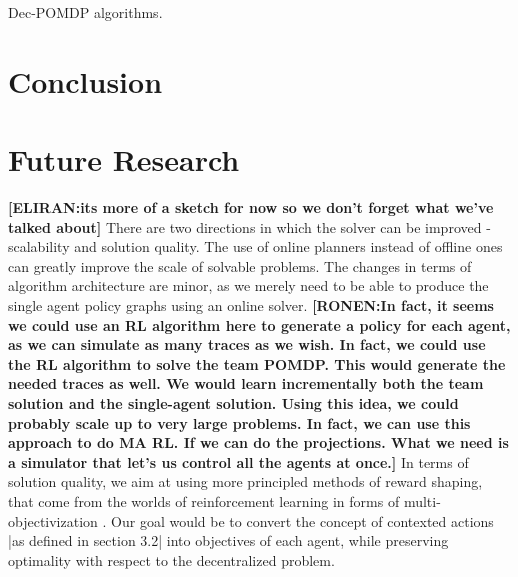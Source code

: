 \documentclass[letterpaper]{article} %
\newcommand{\eliran}[1]{\textbf{[\color{red}ELIRAN:#1]}}
\newcommand{\ronen}[1]{\textbf{[\color{blue}RONEN:#1]}}
\begin{document}
Dec-POMDP algorithms.

\section{Conclusion}

\section{Future Research}
\eliran{its more of a sketch for now so we don't forget what we've talked about}
There are two directions in which the solver can be improved -  scalability and solution quality.
The use of online planners instead of offline ones can greatly improve the scale of solvable problems. The changes in terms of algorithm architecture are minor, as we merely need to be able to produce the single agent policy graphs using an online solver. \ronen{In fact, it seems we could use an RL algorithm here to generate a policy for each agent, as we can simulate as many traces as we wish.
In fact, we could use the RL algorithm to solve the team POMDP. This would generate the needed traces as well. We would learn incrementally
both the team solution and the single-agent solution. Using this idea, we could probably scale up to very large problems. In fact, we can use this
approach to do MA RL. If we can do the projections. What we need is a simulator that let's us control all the agents at once.}
In terms of solution quality, we aim at using more principled methods of reward shaping, that come from the worlds of reinforcement learning in forms of multi-objectivization \cite{REWARDSHAPING}.
Our goal would be to convert the concept of contexted actions |as defined in section 3.2| into objectives of each agent, while preserving optimality with respect to the decentralized problem.



\end{document}
